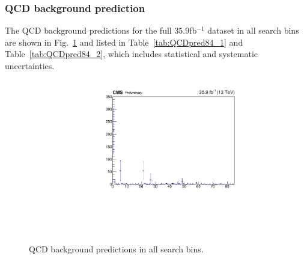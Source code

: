 \subsubsection{QCD background prediction}
The QCD background predictions for the full $35.9$fb$^{-1}$ dataset in all 
search bins are shown in Fig.~\ref{fig:SBPrediction} and listed in 
Table~\ref{tab:QCDpred84_1} and Table~\ref{tab:QCDpred84_2}, which includes statistical and systematic uncertainties.
\begin{figure}[htbp]
\begin{center}
\includegraphics[width=0.89\textwidth]{sections/mc4/Backgrounds/QCD/figures/84sb/_sb_Data.pdf}
\end{center}\caption{QCD background predictions in all search bins.}
\label{fig:SBPrediction}
\end{figure}

